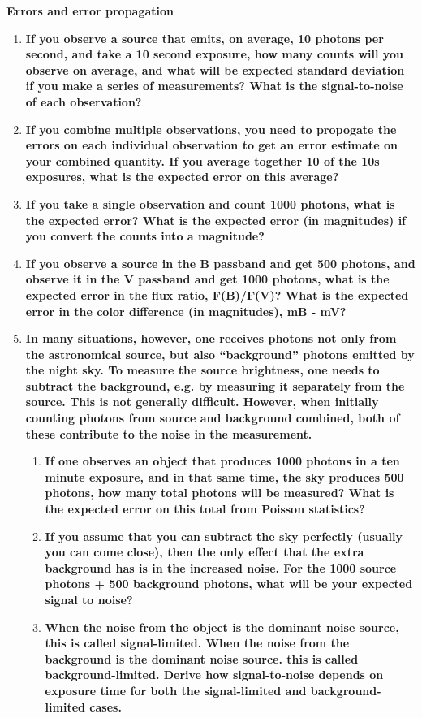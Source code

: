 \documentclass[12pt]{article}
\begin{document}


\textbf{Errors and error propagation}\small
\begin{enumerate}
    \item\textbf{If you observe a source that emits, on average, 10
    photons per second, and take a 10 second exposure, how many counts
    will you observe on average, and what will be expected standard
    deviation if you make a series of measurements? What is the
    signal-to-noise of each observation?}
    \item\textbf{If you combine multiple observations, you need to
    propogate the errors on each individual observation to get an
    error estimate on your combined quantity. If you average together
    10 of the 10s exposures, what is the expected error on this
    average?}
    \item\textbf{If you take a single observation and count 1000
    photons, what is the expected error? What is the expected error
    (in magnitudes) if you convert the counts into a magnitude?}
    \item\textbf{If you observe a source in the B passband and get 500
    photons, and observe it in the V passband and get 1000 photons,
    what is the expected error in the flux ratio, F(B)/F(V)? What is
    the expected error in the color difference (in magnitudes), mB -
    mV?}
    \item\textbf{In many situations, however, one receives photons not
    only from the astronomical source, but also ``background'' photons
    emitted by the night sky. To measure the source brightness, one
    needs to subtract the background, e.g. by measuring it separately
    from the source. This is not generally difficult. However, when
    initially counting photons from source and background combined,
    both of these contribute to the noise in the measurement.}
    \begin{enumerate}
        \item\textbf{If one observes an object that produces 1000
        photons in a ten minute exposure, and in that same time, the
        sky produces 500 photons, how many total photons will be
        measured? What is the expected error on this total from
        Poisson statistics?}
        \item\textbf{If you assume that you can subtract the sky
        perfectly (usually you can come close), then the only effect
        that the extra background has is in the increased noise. For
        the 1000 source photons + 500 background photons, what will be
        your expected signal to noise?}
        \item\textbf{When the noise from the object is the dominant
        noise source, this is called signal-limited. When the noise
        from the background is the dominant noise source. this is
        called background-limited. Derive how signal-to-noise depends
        on exposure time for both the signal-limited and
        background-limited cases.}
    \end{enumerate}

\end{enumerate}


\end{document}
